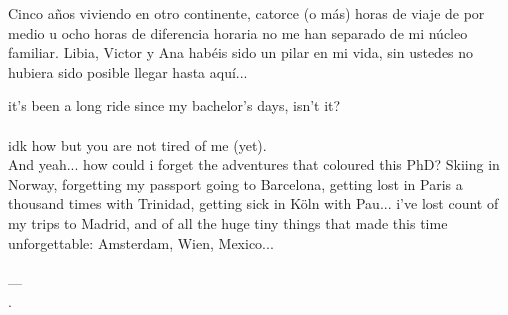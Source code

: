 {{  \newpage
  \vspace*{4.8cm}

  \vspace{5mm}%
  Cinco años viviendo en otro continente, catorce (o más) horas de viaje de por
  medio u ocho horas de diferencia horaria no me han separado de mi núcleo
  familiar. Libia, Victor y Ana habéis sido un pilar en mi vida, sin ustedes no
  hubiera sido posible llegar hasta aquí...

  \noindent\hspace*{2\parindent}
    it's been a long ride since my bachelor's days, isn't it?\\ [-2pt]
  \hspace*{0.74\textwidth}\\ [-5pt]
  \noindent\hspace*{4\parindent}
    idk how but you are not tired of me (yet).\\ [-5pt]

  \vspace{11mm}%
  And yeah... how could i forget the adventures that coloured this PhD? Skiing in
  Norway, forgetting my passport going to Barcelona, getting lost in Paris
  a thousand times with Trinidad, getting sick in Köln with Pau...  i've lost
  count of my trips to Madrid, and of all the huge tiny things that made this
  time unforgettable:
  Amsterdam, Wien, Mexico...\\ [-0.2em]
  \vspace{-6pt}%
  \hspace*{0.88\textwidth}\\
  \vspace{-7pt}%
  \hspace*{0.88\textwidth}---\\
  \vspace{-12pt}%
  \hspace*{0.88\textwidth}.

}}

\hspace*{0.9\textwidth}

\vspace{-15pt}%
\noindent{}\\

\vspace{-1.1pt}%
\hspace*{0.8\textwidth}\makebox[0pt][r]{
  \vcastor[\number\year]
}

\newpage

